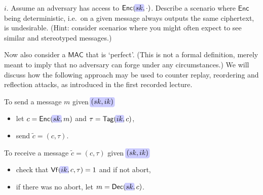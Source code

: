 \documentclass[finalnosol]{problemset}
\newcommand\mybox[2][]{\tikz[overlay]\node[fill=blue!20,inner sep=2pt, anchor=text, rectangle, rounded corners=1mm,#1] {\ensuremath{#2}};\phantom{#2}}
\newcommand{\MAC}{\ensuremath{\mathsf{MAC}}}
\newcommand{\Tag}{\ensuremath{\mathsf{Tag}}}
\newcommand{\Vf}{\ensuremath{\mathsf{Vf}}}
\newcommand{\Enc}{\ensuremath{\mathsf{Enc}}}
\newcommand{\Dec}{\ensuremath{\mathsf{Dec}}}
\begin{document}
    $i$. Assume an adversary has access to $\Enc(\mybox{sk}, \cdot)$.
    Describe a scenario where $\Enc$ being deterministic, i.e.~on a given message always outputs the same ciphertext, is undesirable. (Hint: consider scenarios where you might often expect to see similar and stereotyped messages.)


    Now also consider a $\MAC$ that is `perfect'.
    (This is not a formal definition, merely meant to imply that no adversary can forge under any circumstances.)
    We will discuss how the following approach may be used to counter replay, reordering and reflection attacks, as introduced in the first recorded lecture.

    To send a message $m$ given $\mybox{(sk, ik)}$
    \begin{itemize}
        \item let $c = \Enc(\mybox{sk}, m)$ and $\tau = \Tag(\mybox{ik}, c)$,
        \item send $\tilde{c} = (c, \tau)$.
    \end{itemize}

    To receive a message $\tilde{c} = (c, \tau)$ given $\mybox{(sk, ik)}$
    \begin{itemize}
        \item check that $\Vf(\mybox{ik}, c, \tau) = 1$ and if not abort,
        \item if there was no abort, let $m = \Dec(\mybox{sk}, c)$.
    \end{itemize}
\end{document}
